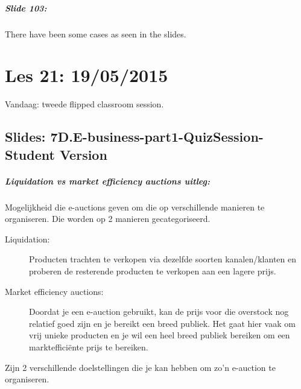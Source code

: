 \documentclass[10pt,a4paper]{report}
\begin{document}
\paragraph{Slide 103:}There have been some cases as seen in the slides.

\chapter{Les 21: 19/05/2015}
Vandaag: tweede flipped classroom session.\\

\section{Slides: 7D.E-business-part1-QuizSession-Student Version}

\paragraph{Liquidation vs market efficiency auctions uitleg:}Mogelijkheid die e-auctions geven om die op verschillende manieren te organiseren. Die worden op 2 manieren gecategoriseerd.\\
\begin{description}
\item[Liquidation:]Producten trachten te verkopen via dezelfde soorten kanalen/klanten en proberen de resterende producten te verkopen aan een lagere prijs.
\item[Market efficiency auctions:]Doordat je een e-auction gebruikt, kan de prijs voor die overstock nog relatief goed zijn en je bereikt een breed publiek. Het gaat hier vaak om vrij unieke producten en je wil een heel breed publiek bereiken om een markteffici\"ente prijs te bereiken. 
\end{description}
Zijn 2 verschillende doelstellingen die je kan hebben om zo'n e-auction te organiseren.
\end{document}
